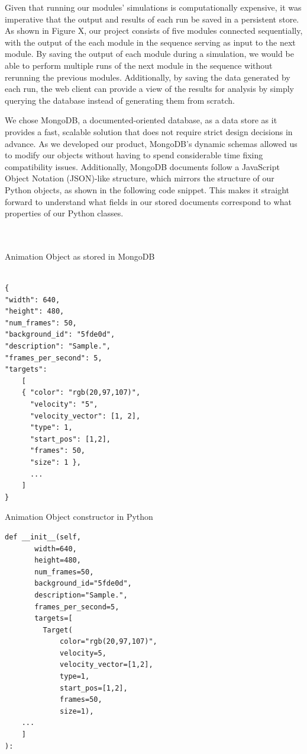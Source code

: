\documentclass[a4paper,11pt]{article}
\begin{document}
Given that running our modules' simulations is computationally expensive, it was imperative that the output and results of each run be saved in a persistent store. As shown in Figure X, our project consists of five modules connected sequentially, with the output of the each module in the sequence serving as input to the next module. By saving the output of each module during a simulation, we would be able to perform multiple runs of the next module in the sequence without rerunning the previous modules. Additionally, by saving the data generated by each run, the web client can provide a view of the results for analysis by simply querying the database instead of generating them from scratch.

We chose MongoDB, a documented-oriented database, as a data store as it provides a fast, scalable solution that does not require strict design decisions in advance. As we developed our product, MongoDB's dynamic schemas allowed us to modify our objects without having to spend considerable time fixing compatibility issues. Additionally, MongoDB documents follow a JavaScript Object Notation (JSON)-like structure, which mirrors the structure of our Python objects, as shown in the following code snippet. This makes it straight forward to understand what fields in our stored documents correspond to what properties of our Python classes.\\
\\
\\
\begin{minipage}[t]{0.5\textwidth}
\centering  
Animation Object as stored in MongoDB
\begin{verbatim}
  
{
"width": 640,
"height": 480,
"num_frames": 50,
"background_id": "5fde0d",
"description": "Sample.",
"frames_per_second": 5,
"targets":
	[
	{ "color": "rgb(20,97,107)",
	  "velocity": "5",
	  "velocity_vector": [1, 2],
	  "type": 1,
	  "start_pos": [1,2],
	  "frames": 50,
	  "size": 1 },
	  ...
	]
}
\end{verbatim}
\end{minipage} 
\begin{minipage}[t]{0.5\textwidth}
\centering  
Animation Object constructor in Python
\begin{verbatim}	
def __init__(self,
  	   width=640,
  	   height=480,    
  	   num_frames=50,
  	   background_id="5fde0d",
  	   description="Sample.",
  	   frames_per_second=5,
  	   targets=[
  	     Target(
	         color="rgb(20,97,107)",
	         velocity=5,
	         velocity_vector=[1,2],
	         type=1,
	         start_pos=[1,2],
	         frames=50,
	         size=1),
	...
	]
):
\end{verbatim}
\end{minipage}
\end{document}
